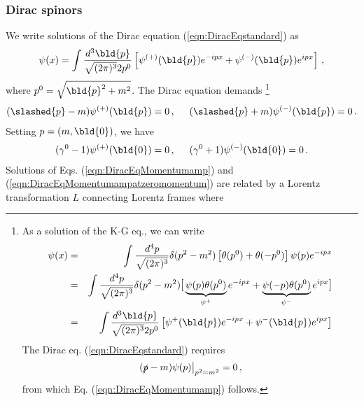 \subsubsection{Dirac spinors}

We write solutions of the Dirac equation (\ref{eqn:DiracEqstandard}) as
\begin{eqnarray}
\psi(x) = \int \frac{d^3 \bld{p}}{\sqrt{(2\pi)^3} 2 p^0}
 \left[
\psi^{(+)}(\bld{p}) e^{-ipx} + \psi^{(-)}(\bld{p}) e^{ipx}
\right]\,,
\label{eqn:Diracfieldbypsipm}
\end{eqnarray}
where $p^0 = \sqrt{\bld{p}^2 + m^2}$.
The Dirac equation demands
\footnote{%
As  a solution of the K-G eq., we can write
\begin{eqnarray*}
\psi(x) &=& \int \frac{d^4 p}{\sqrt{(2\pi)^3}}
\delta(p^2 - m^2) 
 \left[
 \theta(p^0) +  \theta(-p^0) \right]
 \psi(p) e^{-ipx}
\\
&=&
\int \frac{d^4 p}{\sqrt{(2\pi)^3}}
\delta(p^2 - m^2)  
{\large \mbox{[}}
\underbrace{\psi(p)\theta(p^0)}_{\psi^{+}}  e^{-ipx} + 
\underbrace{\psi(-p)\theta(p^0)}_{\psi^{-}}  e^{ipx}
{\large \mbox{]}}
\\
&=&
\int \frac{d^3 \bld{p}}{\sqrt{(2\pi)^3}2p^0}
\left[
\psi^{+}(\bld{p})  e^{-ipx} + \psi^{-}(\bld{p})  e^{ipx}
\right]
\end{eqnarray*}
The Dirac eq. (\ref{eqn:DiracEqstandard}) requires
\begin{eqnarray*}
\left. (\slashed{p} - m) \psi(p) \right|_{p^2 = m^2} = 0\,,
\end{eqnarray*}
from which Eq. (\ref{eqn:DiracEqMomentumamp}) follows.
}%
\begin{eqnarray}
(\slashed{p} - m) \psi^{(+)}(\bld{p}) = 0\,,
\hspace{5mm}
(\slashed{p} + m) \psi^{(-)}(\bld{p}) = 0 \,.
\label{eqn:DiracEqMomentumamp}
\end{eqnarray}
Setting $p = (m, \bld{0})$, we have 
\begin{eqnarray}
(\gamma^0 - 1) \psi^{(+)}(\bld{0}) = 0\,,
\hspace{5mm}
(\gamma^0 + 1) \psi^{(-)}(\bld{0}) = 0 \,.
\label{eqn:DiracEqMomentumampatzeromomentum}
\end{eqnarray}
Solutions of Eqs. (\ref{eqn:DiracEqMomentumamp}) and
(\ref{eqn:DiracEqMomentumampatzeromomentum})
are related by a Lorentz transformation $L$
connecting Lorentz frames where
